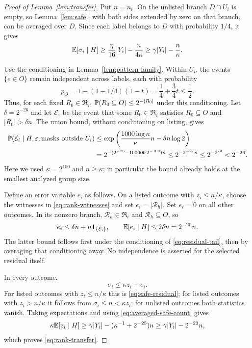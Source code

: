 \begin{proof}[Proof of Lemma~\ref{lem:transfer}]
Put $n=n_i$.  On the unlisted branch $D\cap U_i$ is empty, so
Lemma~\ref{lem:safe}, with both sides extended by zero on that branch,
can be averaged over $D$.  Since each label belongs to $D$ with
probability $1/4$, it gives
\begin{equation}\label{eq:averaged-safe-count}
 \mathbb E[\sigma_i\mid H]
 \ge\frac\eta{16}|Y_i|-\frac{n}{4\kappa}
 \ge\gamma|Y_i|-\frac n\kappa.
\end{equation}

Use the conditioning in Lemma~\ref{lem:pattern-family}.  Within $U_i$,
the events $\{e\in O\}$ remain independent across labels, each with
probability
\[
 p_O=1-(1-1/4)(1-t)=\frac14+\frac34t\le\frac12.
\]
Thus, for each fixed $R_0\in\mathfrak R_i$,
$\mathbb P(R_0\subseteq O)\le2^{-|R_0|}$ under this conditioning.
Let $\delta=2^{-26}$ and let $\mathcal E_i$ be the event that some
$R_0\in\mathfrak R_i$ satisfies $R_0\subseteq O$ and $|R_0|>\delta n$.
The union bound, without conditioning on listing, gives
\begin{align}
 \mathbb P(\mathcal E_i\mid H,\varepsilon,
                  \text{masks outside }U_i)
 &\le\exp\left(\frac{1000\log\kappa}{\kappa}n
                         -\delta n\log2\right)\notag\\
 &=2^{-(2^{-26}-100000\,2^{-100})n}
 \le2^{-2^{-27}n}
 \le2^{-2^{73}}<2^{-26}.
 \label{eq:residual-tail}
\end{align}
Here we used $\kappa=2^{100}$ and $n\ge\kappa$; in particular the
bound already holds at the smallest analyzed group size.

Define an error variable $e_i$ as follows.  On a listed outcome with
$z_i\le n/\kappa$, choose the witnesses in
\eqref{eq:rank-witnesses} and set $e_i=|\mathcal R_h|$.
Set $e_i=0$ on all other outcomes.  In its nonzero branch,
$\mathcal R_h\in\mathfrak R_i$ and $\mathcal R_h\subseteq O$, so
\[
 e_i\le\delta n+n\mathbf 1_{\{\mathcal E_i\}},
 \qquad
 \mathbb E[e_i\mid H]\le2\delta n=2^{-25}n.
\]
The latter bound follows first under the conditioning of
\eqref{eq:residual-tail}, then by averaging that conditioning away.
No independence is asserted for the selected residual itself.

In every outcome,
\[
 \sigma_i\le\kappa z_i+e_i.
\]
For listed outcomes with $z_i\le n/\kappa$ this is
\eqref{eq:safe-residual}; for listed outcomes with $z_i>n/\kappa$
it follows from $\sigma_i\le n<\kappa z_i$; for unlisted outcomes
both statistics vanish.  Taking expectations and using
\eqref{eq:averaged-safe-count} gives
\[
 \kappa\mathbb E[z_i\mid H]
 \ge\gamma|Y_i|-(\kappa^{-1}+2^{-25})n
 \ge\gamma|Y_i|-2^{-23}n,
\]
which proves \eqref{eq:rank-transfer}.
\end{proof}

